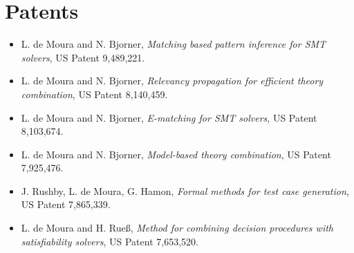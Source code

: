\documentclass{article}
\begin{document}
\section*{Patents}
\begin{itemize}
\item L. de Moura and N. Bjorner, \emph{Matching based pattern inference for SMT solvers}, US Patent 9,489,221.
\item L. de Moura and N. Bjorner, \emph{Relevancy propagation for efficient theory combination}, US Patent 8,140,459.
\item L. de Moura and N. Bjorner, \emph{E-matching for SMT solvers}, US Patent 8,103,674.
\item L. de Moura and N. Bjorner, \emph{Model-based theory combination}, US Patent 7,925,476.
\item J. Rushby, L. de Moura, G. Hamon, \emph{Formal methods for test case generation}, US Patent 7,865,339.
\item L. de Moura and H. Rue\ss, \emph{Method for combining decision procedures with satisfiability solvers}, US Patent 7,653,520.
\end{itemize}
\end{document}
